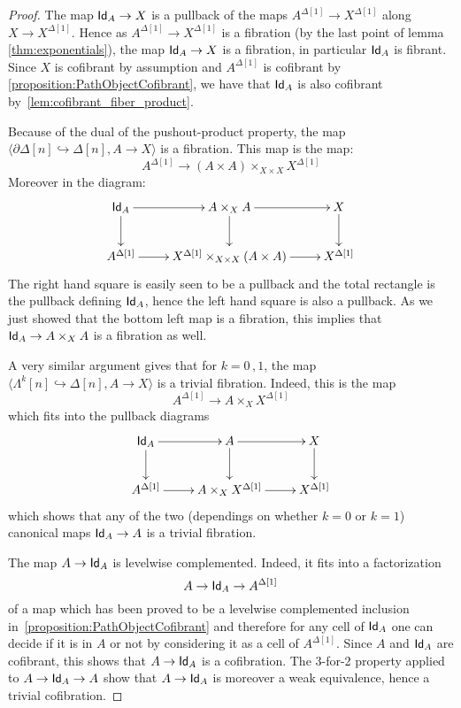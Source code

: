 \documentclass[reqno,10pt,a4paper,oneside,draft]{amsart}
\begin{document}
\begin{proof}

The map $\mathsf{Id}_A \rightarrow X$ is a pullback of the maps $A^{\Delta[1]} \rightarrow X^{\Delta[1]}$ along $X \rightarrow X^{\Delta[1]}$. Hence as $A^{\Delta[1]} \rightarrow X^{\Delta[1]}$ is a fibration (by the last point of lemma \ref{thm:exponentials}), the map $\mathsf{Id}_A \rightarrow X$ is a fibration, in particular $\mathsf{Id}_A$ is fibrant. Since $X$ is cofibrant by assumption and $A^{\Delta[1]}$ is  cofibrant by \cref{proposition:PathObjectCofibrant}, we have that $\mathsf{Id}_A$ is also cofibrant by~\cref{lem:cofibrant_fiber_product}. 

Because of the dual of the pushout-product property, the map $\langle \partial \Delta[n] \hookrightarrow \Delta[n] ,  A \rightarrow X \rangle$ is a fibration. This map is the map:
\[ 
A^{\Delta[1]} \rightarrow (A \times A) \times_{X \times X} X^{\Delta[1]} 
\] 
Moreover in the diagram:
\[
\xymatrix{
\Id_A \ar[r] \ar[d] & A \times_{X} A \ar[d] \ar[r] & X \ar[d] \\
A^{\Delta[1]} \ar[r] & X^{\Delta[1]}  \times_{X \times X}  (A \times A) \ar[r]  & X^{\Delta[1]}
}
 \]
The right hand square is easily seen to be a pullback and the total rectangle is the pullback defining $\mathsf{Id}_A$, hence the left hand square is also a pullback. As we just showed that the bottom left map is a fibration, this implies that $\mathsf{Id}_A \rightarrow A \times_{X} A$ is a fibration as well.

A very similar argument gives that for $k=0 \, , 1$, the map $\langle \Lambda^k[n] \hookrightarrow \Delta[n] ,  A \rightarrow X\rangle$ is a trivial fibration. Indeed, this is the map
\[ 
A^{\Delta[1]} \rightarrow  A  \times_X X^{\Delta[1]} 
\] 
which fits into the pullback diagrams
\[
\xymatrix{
\Id_A \ar[r] \ar[d] & A  \ar[d] \ar[r] & X \ar[d] \\
A^{\Delta[1]} \ar[r] & A \times_X X^{\Delta[1]} \ar[r]  & X^{\Delta[1]}
}
 \]
which  shows that any of the two (dependings on whether $k=0$ or $k=1$) canonical maps $\mathsf{Id}_A \rightarrow A$ is a trivial fibration.

The map $A \rightarrow \mathsf{Id}_A$ is levelwise complemented. Indeed, it fits into a factorization 
\[
A \rightarrow \mathsf{Id}_A \rightarrow A^{\Delta[1]}
\] 
of a map which has been proved to be a levelwise complemented inclusion in~\cref{proposition:PathObjectCofibrant} and therefore for any cell of $\mathsf{Id}_A$ one can decide if it is in $A$ or not by considering it as a cell of $A^{\Delta[1]}$. Since $A$ and $\mathsf{Id}_A$ are cofibrant, this shows that $A \rightarrow \mathsf{Id}_A$ is a cofibration. The 3-for-2 property applied to $A \rightarrow \mathsf{Id}_A \rightarrow A$ show that  $A \rightarrow \mathsf{Id}_A$ is moreover a weak equivalence, hence a trivial cofibration.
\end{proof}
\end{document}
